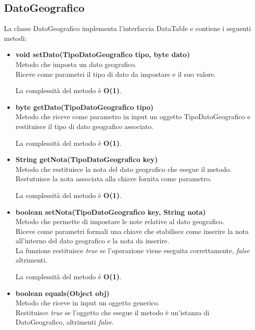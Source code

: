 \documentclass[a4paper, 12pt]{scrreprt}
\begin{document}
			\subsection{DatoGeografico}
			La classe DatoGeografico implementa l'interfaccia DataTable e contiene i seguenti metodi:
			\begin{itemize}
				\item \textbf{void setDato(TipoDatoGeografico tipo, byte dato)}
				\\Metodo che imposta un dato geografico.
				\\Riceve come parametri il tipo di dato da impostare e il suo valore.
				
				La complessit\`a del metodo è \textbf{O(1)}.
				
				\item \textbf{byte getDato(TipoDatoGeografico tipo)}
				\\Metodo che riceve come parametro in input un oggetto TipoDatoGeografico e restituisce il tipo di dato geografico associato.
				
				La complessit\`a del metodo è \textbf{O(1)}.
				
				\item \textbf{String getNota(TipoDatoGeografico key)}
				\\Metodo che restituisce la nota del dato geografico che esegue il metodo.
				\\Restutuisce la nota associata alla chiave fornita come parametro.
				
				La complessit\`a del metodo è \textbf{O(1)}.
				
				\item \textbf{boolean setNota(TipoDatoGeografico key, String nota)}
				\\Metodo che permette di impostare le note relative al dato geografico.
				\\Riceve come parametri formali una chiave che stabilisce come inserire la nota all'interno del dato geografico e la nota da inserire.
				\\La funzione restituisce \textit{true} se l'operazione viene eseguita correttamente, \textit{false} altrimenti.
				
				La complessit\`a del metodo è \textbf{O(1)}.
				
				\item \textbf{boolean equals(Object obj)}
				\\Metodo che riceve in input un oggetto generico.
				\\Restituisce \textit{true} se l'oggetto che esegue il metodo \`e un'istanza di DatoGeografico, altrimenti \textit{false}.
				

\end{itemize}
\end{document}
